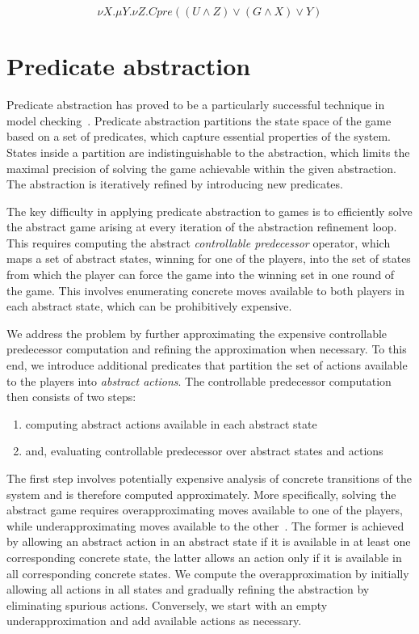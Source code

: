 \documentclass{book}
\theoremstyle{definition}
\begin{document}
\begin{equation}
    \nu X. \mu Y. \nu Z. Cpre((U \wedge Z) \vee (G \wedge X) \vee Y)
\end{equation}

\section{Predicate abstraction}

Predicate abstraction has proved to be a particularly successful technique in model checking~\cite{Graf_Saidi_97}. Predicate abstraction partitions the state space of the game based on a set of predicates, which capture essential properties of the system. States inside a partition are indistinguishable to the abstraction, which limits the maximal precision of solving the game achievable within the given abstraction. The abstraction is iteratively refined by introducing new predicates.

The key difficulty in applying predicate abstraction to games is to efficiently solve the abstract game arising at every iteration of the abstraction refinement loop. This requires computing the abstract \emph{controllable predecessor} operator, which maps a set of abstract states, winning for one of the players, into the set of states from which the player can force the game into the winning set in one round of the game. This involves enumerating concrete moves available to both players in each abstract state, which can be prohibitively expensive.  

We address the problem by further approximating the expensive controllable predecessor computation and refining the approximation when necessary. To this end, we introduce additional predicates that partition the set of actions available to the players into \emph{abstract actions}. The controllable predecessor computation then consists of two steps: 

\begin{enumerate}
    \item computing abstract actions available in each abstract state
    \item and, evaluating controllable predecessor over abstract states and actions
\end{enumerate}

The first step involves potentially expensive analysis of concrete transitions of the system and is therefore computed approximately. More specifically, solving the abstract game requires overapproximating moves available to one of the players, while underapproximating moves available to the other~\cite{Henzinger_JM_03}.  The former is achieved by allowing an abstract action in an abstract state if it is available in at least one corresponding concrete state, the latter allows an action only if it is available in all corresponding concrete states. We compute the overapproximation by initially allowing all actions in all states and gradually refining the abstraction by eliminating spurious actions.  Conversely, we start with an empty underapproximation and add available actions as necessary.
\end{document}
